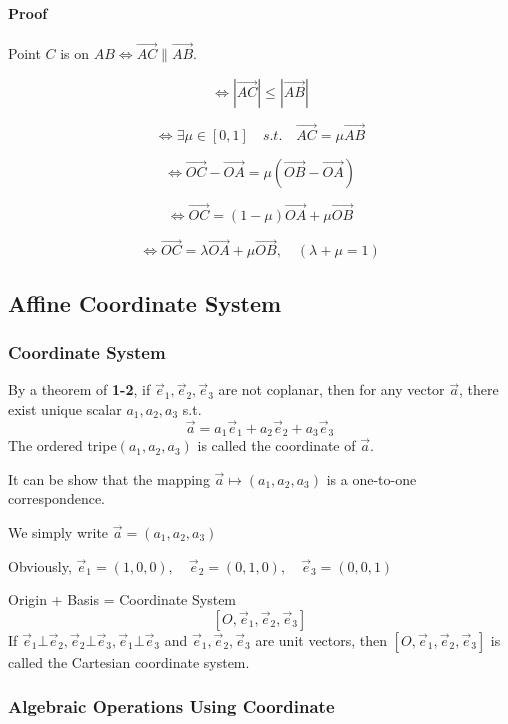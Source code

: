 \documentclass[11pt]{book}
\begin{document}
\paragraph{Proof}

Point $C$ is on $AB \iff \overrightarrow{AC} \parallel \overrightarrow{AB}$.

$$
\iff |\overrightarrow{AC}|\leq |\overrightarrow{AB}| 
$$

$$
\iff \exists \mu \in [0,1]  \quad s.t. \quad  \overrightarrow{AC}= \mu \overrightarrow{AB} 
$$

$$
\iff \overrightarrow {OC}-\overrightarrow {OA} = \mu (\overrightarrow{OB}- \overrightarrow{OA}) 
$$

$$
\iff \overrightarrow{OC} = (1-\mu)\overrightarrow{OA}+\mu \overrightarrow{OB}
$$

$$
\iff \overrightarrow{OC} = \lambda \overrightarrow{OA}+ \mu \overrightarrow{OB},\quad (\lambda + \mu  = 1)
$$




\subsection{Affine Coordinate System}

\subsubsection{ Coordinate System }

By a theorem of \textbf{1-2}, if $\vec e_1,\vec e_2,\vec e_3$ are not coplanar, then for any vector $\vec a$, there exist unique scalar $a_1,a_2,a_3$ s.t.
$$
\vec a  = a_1 \vec e_1+ a_2 \vec e_2 + a_3\vec e_3
$$
The ordered tripe$(a_1,a_2,a_3)$ is called the coordinate of $\vec a $.

It can be show that the mapping $\vec a \mapsto   (a_1,a_2,a_3)$ is a one-to-one  correspondence.

We simply write $\vec a  = (a_1,a_2,a_3)$ 

Obviously, $\vec e_1 = (1,0,0),\quad \vec e_2 = (0,1,0), \quad \vec e_3 = (0,0,1)$

Origin + Basis = Coordinate System
$$
[O,\vec e_1,\vec e_2,\vec e_3]
$$
If $\vec e_1 \bot \vec e_2, \vec e_2 \bot \vec e_3, \vec e_1 \bot \vec e_3$ and $\vec e_1,\vec e_2, \vec e_3$ are unit vectors, 
then $[O,\vec e_1,\vec e_2,\vec e_3]$ is called the Cartesian coordinate system.

\subsubsection{Algebraic Operations Using Coordinate}
\end{document}

